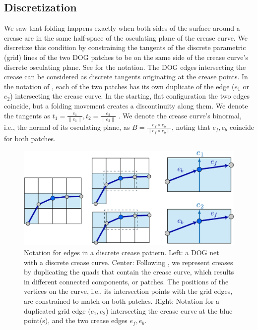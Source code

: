 \subsection{Discretization}
We saw that folding happens exactly when both sides of the surface around a crease are in the same half-space of the osculating plane of the crease curve. We discretize this condition by constraining the tangents of the discrete parametric (grid) lines of the two DOG patches to be on the same side of the crease curve's discrete osculating plane. See  for the notation. The DOG edges intersecting the crease can be considered as discrete tangents originating at the crease points. In the notation of , each of the two patches has its own duplicate of the edge ($e_1$ or $e_2$) intersecting the crease curve. In the starting, flat configuration the two edges coincide, but a folding movement creates a discontinuity along them. We denote the tangents as $t_1 = \frac{e_1}{\|e_1\|}, t_2 = \frac{e_2}{\|e_2\|}$ . We denote the crease curve's binormal, i.e., the normal of its osculating plane, as $B = \frac{e_f \times e_b}{\|e_f \times e_b\|}$, noting that $e_f,e_b$ coincide for both patches.

\begin{figure} [h]
	\centering
	\includegraphics[width=\linewidth]{figures/osc_plane_discretization}
	\caption{Notation for edges in a discrete crease pattern. Left: a DOG net with a discrete crease curve. Center: Following \cite{rabi2018shape}, we represent creases by duplicating the quads that contain the crease curve, which results in different connected components, or patches. The positions of the vertices on the curve, i.e., its intersection points with the grid edges, are constrained to match on both patches. Right: Notation for a duplicated grid edge ($e_1, e_2$) intersecting the crease curve at the blue point(s), and the two crease edges $e_f,e_b$. }
	\label{fig:osc_plane_discretization}
\end{figure}

